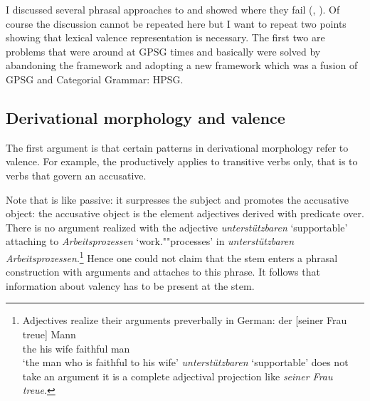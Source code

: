 \documentclass[output=paper]{langsci/langscibook}
\begin{document}
I discussed several phrasal approaches to  and showed where they fail
(\citeauthor{Mueller2006d}, \citeyear*{Mueller2006d,Mueller2006c,Mueller2007d,MuellerPersian,MWArgSt,MWArgStReply,MuellerLFGphrasal}).
Of course
the discussion cannot be repeated here but I want to repeat two points showing that lexical valence
representation is necessary. The first two are problems that were around at GPSG times and basically
were solved by abandoning the framework and adopting a new framework which was a fusion of GPSG and
Categorial Grammar: HPSG.

\subsection{Derivational morphology and valence} 

The first argument \citep[Section~5.5.1]{MuellerGT-Eng1} is that certain patterns in derivational morphology refer to valence. For
example, the \bard productively applies to transitive verbs only, that is to verbs that govern an accusative.
\eal
{}
\zl
\begin{sloppypar}
\noindent
Note that \bard is like passive: it surpresses the subject and promotes the accusative object: the
accusative object is the element adjectives derived with \bard predicate over. There is no argument
realized with the adjective \emph{unterstützbaren} `supportable' attaching to \emph{Arbeitsprozessen} `work.""processes' in \emph{unterstützbaren
  Arbeitsprozessen}.\footnote{
Adjectives realize their arguments preverbally in German:
\ea
\gll der [seiner Frau treue] Mann\\
     the \spacebr{}his wife faithful man\\
\glt `the man who is faithful to his wife'
\z
\emph{unterstützbaren} `supportable' does not take an argument it is a complete adjectival projection like \emph{seiner Frau treue}.
}  Hence one could not claim that the stem enters a phrasal construction with arguments and
 attaches to this phrase. It follows that information about valency has to be present at
the stem. 
\end{sloppypar}
\end{document}
